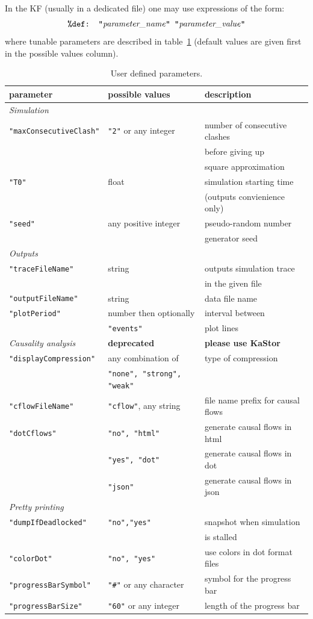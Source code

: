 \documentclass[11pt]{book}
\def\ttt#1{\texttt{#1}}
\begin{document}
In the KF (usually in a dedicated file) one may use expressions of the form:
\[
\hbox{\ttt{\%def: "}\textit{parameter\_name}\ttt{" "}\textit{parameter\_value}\ttt{"}}
\]
where tunable parameters are described in table~\ref{tab:parameters} (default values are given first in the possible values column).
\begin{table}[ht]
\caption{User defined parameters.}
\begin{tabular}{l|l|l}
parameter & possible values & description \\
\hline
\textit{Simulation} & &\\
\ttt{"maxConsecutiveClash"} & \ttt{"2"} or any integer & \small number of consecutive clashes \\
&& \small before giving up \\
&& \small square approximation\\
\ttt{"T0"} & float & \small simulation starting time\\
&& \small (outputs convienience only)\\
\ttt{"seed"} & any positive integer & \small pseudo-random number\\
&& \small generator seed\\ \hline
\textit{Outputs}&&\\
\ttt{"traceFileName"} & string & \small outputs simulation trace\\
&&\small in the given file\\
\ttt{"outputFileName"} & string & \small data file name\\
\ttt{"plotPeriod"} & number then optionally& \small interval between\\
& \ttt{"events"} & plot lines\\
\textit{Causality analysis}&\textbf{deprecated}&\textbf{please use KaStor}\\
\ttt{"displayCompression"} & any combination of & \small type of compression \\
&  \ttt{"none", "strong", "weak"} & \\
\ttt{"cflowFileName"} & \ttt{"cflow"}, any string & \small file name prefix for causal flows\\
\ttt{"dotCflows"} & \ttt{"no", "html"} & \small generate causal flows in html \\
& \ttt{"yes", "dot"} & \small generate causal flows in dot \\
& \ttt{"json"} & \small generate causal flows in json\\ \hline
\textit{Pretty printing}& &\\
\ttt{"dumpIfDeadlocked"} & \ttt{"no","yes"} & \small snapshot when simulation \\&&\small is stalled\\
\ttt{"colorDot"} &  \ttt{"no", "yes"} & \small use colors in dot format files\\
\ttt{"progressBarSymbol"} & \ttt{"\#"} or any character & \small symbol for the progress bar\\
\ttt{"progressBarSize"} & \ttt{"60"} or any integer & \small length of the progress bar\\
\end{tabular}
\label{tab:parameters}
\end{table}
\end{document}
